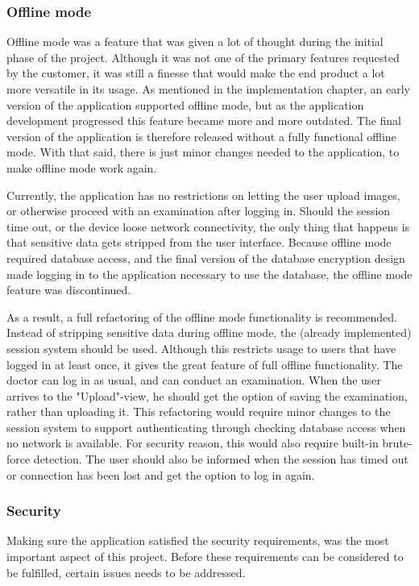 \subsubsection{Offline mode}
\label{evaloffline}
Offline mode was a feature that was given a lot of thought during the initial phase of the project. Although it was not one of the primary features requested by the customer, it was still a finesse that would make the end product a lot more versatile in its usage. As mentioned in the implementation chapter, an early version of the application supported offline mode, but as the application development progressed this feature became more and more outdated. The final version of the application is therefore released without a fully functional offline mode. With that said, there is just minor changes needed to the application, to make offline mode work again. 

Currently, the application has no restrictions on letting the user upload images, or otherwise proceed with an examination after logging in. Should the session time out, or the device loose network connectivity, the only thing that happens is that sensitive data gets stripped from the user interface. Because offline mode required database access, and the final version of the database encryption design made logging in to the application necessary to use the database, the offline mode feature was discontinued.

As a result, a full refactoring of the offline mode functionality is recommended. Instead of stripping sensitive data during offline mode, the (already implemented) session system should be used. Although this restricts usage to users that have logged in at least once, it gives the great feature of full offline functionality. The doctor can log in as usual, and can conduct an examination. When the user arrives to the "Upload"-view, he should get the option of saving the examination, rather than uploading it.
This refactoring would require minor changes to the session system to support authenticating through checking database access when no network is available. For security reason, this would also require built-in brute-force detection.
The user should also be informed when the session has timed out or connection has been lost and get the option to log in again.

\subsubsection{Security}
Making sure the application satisfied the security requirements, was the most important aspect of this project. Before these requirements can be considered to be fulfilled, certain issues needs to be addressed. 

